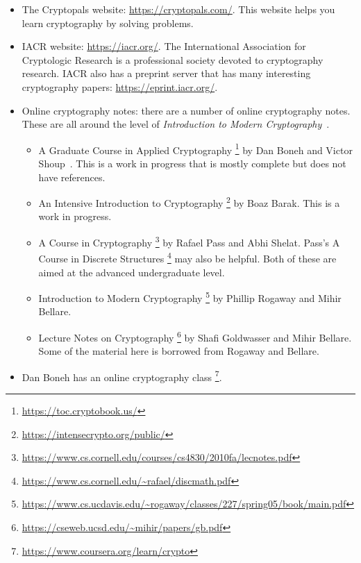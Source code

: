 \begin{itemize}
\item The Cryptopals website: \url{https://cryptopals.com/}.
    This website helps you learn cryptography by solving problems.
\item IACR website: \url{https://iacr.org/}.
    The International Association for Cryptologic Research
    is a professional society devoted to cryptography research.
    IACR also has a preprint server that has many interesting
    cryptography papers: \url{https://eprint.iacr.org/}.
\item Online cryptography notes:
    there are a number of online cryptography notes.
    These are all around the level of
    \emph{Introduction to Modern Cryptography}~\cite{IntroModernCrypto}.

    \begin{itemize}
    \item A Graduate Course in Applied Cryptography%
        \footnote{\url{https://toc.cryptobook.us/}}
        by Dan Boneh and Victor Shoup~\cite{BonehShoupGraduateApplied}.
        This is a work in progress that is mostly complete
        but does not have references.
    \item An Intensive Introduction to Cryptography%
        \footnote{\url{https://intensecrypto.org/public/}} by Boaz Barak.
        This is a work in progress.
    \item A Course in Cryptography%
        \footnote{\url{https://www.cs.cornell.edu/courses/cs4830/2010fa/lecnotes.pdf}}
        by Rafael Pass and Abhi Shelat.
        Pass's A Course in Discrete Structures%
        \footnote{\url{https://www.cs.cornell.edu/~rafael/discmath.pdf}}
        may also be helpful.
        Both of these are aimed at the advanced undergraduate level.
    \item Introduction to Modern Cryptography%
        \footnote{\url{https://www.cs.ucdavis.edu/~rogaway/classes/227/spring05/book/main.pdf}}
        by Phillip Rogaway and Mihir Bellare.
    \item Lecture Notes on Cryptography%
        \footnote{\url{https://cseweb.ucsd.edu/~mihir/papers/gb.pdf}}
        by Shafi Goldwasser and Mihir Bellare.
        Some of the material here is borrowed from Rogaway and Bellare.
    \end{itemize}
\item Dan Boneh has an online cryptography class%
    \footnote{\url{https://www.coursera.org/learn/crypto}}.
\end{itemize}

